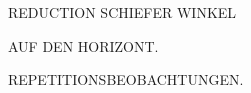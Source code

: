 \par\clearpage
\vspace*{4cm}
\begin{center}
{\fontsize{22}{30}\selectfont
REDUCTION SCHIEFER WINKEL\par
AUF DEN HORIZONT.\par
REPETITIONSBEOBACHTUNGEN.\par}
\end{center}
\vspace{8.2cm}
\noindent\makebox[.86\linewidth][r]{64\textsuperscript{*}}\par
